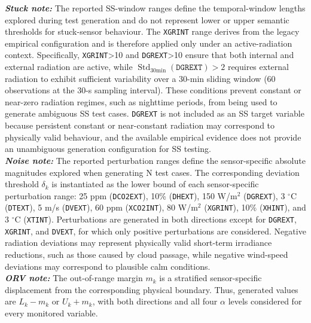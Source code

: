 \documentclass[preprint,12pt]{elsarticle}
\begin{document}
\begin{table}[!t]
{\begin{tabular}{|c|p{10.7cm}|}
\hline
\end{tabular}

\vspace{1mm}
\parbox{\textwidth}{
\scriptsize
\textbf{\textit{Stuck note:}} The reported SS-window ranges define the temporal-window
lengths explored during test generation and do not represent lower or upper
semantic thresholds for stuck-sensor behaviour. The \texttt{XGRINT} range
derives from the legacy empirical configuration and is therefore applied
only under an active-radiation context. Specifically, \texttt{XGRINT}>10
and \texttt{DGREXT}>10 ensure that both internal and external radiation are
active, while
\(\operatorname{Std}_{30\mathrm{min}}(\texttt{DGREXT})>2\)
requires external radiation to exhibit sufficient variability over a
30-min sliding window (60 observations at the 30-s sampling interval).
These conditions prevent constant or near-zero radiation regimes, such as
nighttime periods, from being used to generate ambiguous SS test cases.  \texttt{DGREXT} is not included as an SS target variable because persistent constant or near-constant radiation may correspond to physically valid behaviour, and the available empirical evidence does not provide an unambiguous generation configuration for SS testing.\\
\textbf{\textit{Noise note:}} The reported perturbation ranges define the
sensor-specific absolute magnitudes explored when generating N test cases.
The corresponding deviation threshold \(\delta_k\) is instantiated as the
lower bound of each sensor-specific perturbation range:
25 ppm (\texttt{DCO2EXT}), 10\% (\texttt{DHEXT}),
150 W/m$^2$ (\texttt{DGREXT}), 3 $^\circ$C (\texttt{DTEXT}),
5 m/s (\texttt{DVEXT}), 60 ppm (\texttt{XCO2INT}),
80 W/m$^2$ (\texttt{XGRINT}), 10\% (\texttt{XHINT}), and
3 $^\circ$C (\texttt{XTINT}).
Perturbations are generated in both directions except for
\texttt{DGREXT}, \texttt{XGRINT}, and \texttt{DVEXT}, for which only
positive perturbations are considered. Negative radiation deviations may
represent physically valid short-term irradiance reductions, such as those
caused by cloud passage, while negative wind-speed deviations may correspond
to plausible calm conditions.\\
\textbf{\textit{ORV note:}} The out-of-range margin \(m_k\) is a
stratified sensor-specific displacement from the corresponding physical
boundary. Thus, generated values are \(L_k-m_k\) or \(U_k+m_k\), with both
directions and all four \(\alpha\) levels considered for every monitored
variable.\\

}
}

\end{table}
\end{document}
